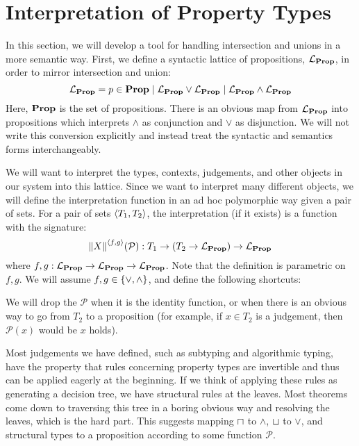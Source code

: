 
\section{Interpretation of Property Types}

In this section, we will develop a tool for handling intersection and unions in a more semantic way. First, we define a syntactic lattice of propositions, $\mathcal{L}_{{\mathbf{Prop}}}$, in order to mirror intersection and union:
$$
\mathcal{L}_{{\mathbf{Prop}}} = p \in {\mathbf{Prop}}
             \mid \mathcal{L}_{{\mathbf{Prop}}} \vee \mathcal{L}_{{\mathbf{Prop}}}
             \mid \mathcal{L}_{{\mathbf{Prop}}} \wedge \mathcal{L}_{{\mathbf{Prop}}}
$$
Here, ${\mathbf{Prop}}$ is the set of propositions. There is an obvious map from $\mathcal{L}_{{\mathbf{Prop}}}$ into propositions which interprets $\wedge$ as conjunction and $\vee$ as disjunction. We will not write this conversion explicitly and instead treat the syntactic and semantics forms interchangeably.

We will want to interpret the types, contexts, judgements, and other objects in our system into this lattice. Since we want to interpret many different objects, we will define the interpretation function in an ad hoc polymorphic way given a pair of sets. For a pair of sets $\left\langle T_1, T_2\right\rangle$, the interpretation (if it exists) is a function with the signature:
$$
  \interpGJ X {\pair f g}  : T_1 \to (T_2 \to \propLattice) \to \propLattice
$$
where $f, g : \mathcal{L}_{{\mathbf{Prop}}} \to \mathcal{L}_{{\mathbf{Prop}}} \to \mathcal{L}_{{\mathbf{Prop}}}$. Note that the definition is parametric on $f,g$. We will assume $f,g \in \lbrace\vee, \wedge\rbrace$,  and define the following shortcuts:
 We will drop the $\mathcal P$ when it is the identity function, or when there is an obvious way to go from $T_2$ to a proposition (for example, if $x \in T_2$ is a judgement, then $\mathcal P {(x)}$ would be $x$ holds).

Most judgements we have defined, such as subtyping and algorithmic typing, have the property that rules concerning property types are invertible and thus can be applied eagerly at the beginning. If we think of applying these rules as generating a decision tree, we have structural rules at the leaves. Most theorems come down to traversing this tree in a boring obvious way and resolving the leaves, which is the hard part. This suggests mapping $\mathbin{\sqcap}$ to $\wedge$, $\mathbin{\sqcup}$ to $\vee$, and structural types to a proposition according to some function $\mathcal P$.

